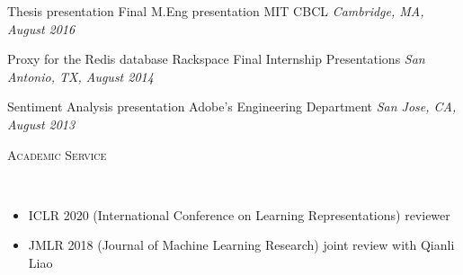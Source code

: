\documentclass{article}
\newenvironment{changemargin}[2]{%
  \begin{list}{}{%
    \setlength{\topsep}{0pt}%
    \setlength{\leftmargin}{#1}%
    \setlength{\rightmargin}{#2}%
    \setlength{\listparindent}{\parindent}%
    \setlength{\itemindent}{\parindent}%
    \setlength{\parsep}{\parskip}%
  }%
  \item[]}{\end{list}
}
\newcommand{\lineover}{
	\begin{changemargin}{-0.05in}{-0.05in}
		\vspace*{-8pt}
		\hrulefill \\
		\vspace*{-2pt}
	\end{changemargin}
}
\newcommand{\header}[1]{
	\begin{changemargin}{-0.5in}{-0.5in}
		\scshape{#1}\\
  	\lineover
	\end{changemargin}
}
\newenvironment{body} {
	\vspace*{-16pt}
	\begin{changemargin}{-0.25in}{-0.5in}
  }	
	{\end{changemargin}
}
\begin{document}
\begin{body}
	
	\vspace{5 pt}
    Thesis presentation
    \hfill
    Final M.Eng presentation MIT CBCL
	\hfill %
	\emph{Cambridge, MA, August 2016}\\
	\vspace*{-3pt}
	
	\vspace{5 pt}
    Proxy for the Redis database
    \hfill
    Rackspace Final Internship Presentations
	\hfill %
	\emph{San Antonio, TX, August 2014}\\
	\vspace*{-3pt}

	\vspace{5 pt}
    Sentiment Analysis presentation
    \hfill
    Adobe’s Engineering Department
	\hfill %
	\emph{San Jose, CA, August 2013}\\
	\vspace*{-3pt}
    
    
\end{body}


\header{Academic Service}

\begin{body}

\vspace{16pt}
\begin{itemize}
    \item ICLR 2020 (International Conference on Learning Representations) reviewer
    \item JMLR 2018 (Journal of Machine Learning Research) joint review with Qianli Liao
\end{itemize}

\end{body}
\end{document}
